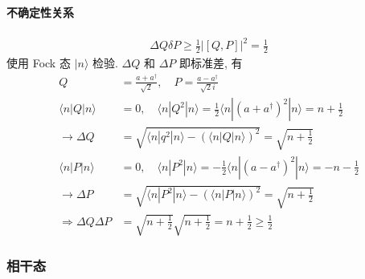 \documentclass[../../main.tex]{subfiles}
\begin{document}
\paragraph{不确定性关系}
\begin{align*}
    \Delta Q\delta P \geq \frac{1}{2}\bigg| [Q,P] \bigg|^{2} = \frac{1}{2}
\end{align*}
使用 Fock 态 $|n\rangle$ 检验. $\Delta Q$ 和 $\Delta P$ 即标准差, 有
\begin{align*}
    Q &= \frac{a + a^{\dagger}}{\sqrt{2}},\quad P = \frac{a - a^{\dagger}}{\sqrt{2}i}\\
    \langle n|Q|n\rangle &= 0,\quad \langle n|Q^{2}|n\rangle = \frac{1}{2}\langle n|(a + a^{\dagger})^{2}|n\rangle = n + \frac{1}{2}\\
    \rightarrow \Delta Q &= \sqrt{\langle n|q^{2}|n\rangle - (\langle n|Q|n\rangle)^{2}} = \sqrt{n + \frac{1}{2}}\\
    \langle n|P|n\rangle &= 0,\quad \langle n|P^{2}|n\rangle = -\frac{1}{2}\langle n|(a - a^{\dagger})^{2}|n\rangle =  - n - \frac{1}{2}\\
    \rightarrow \Delta P &= \sqrt{\langle n|P^{2}|n\rangle - (\langle n|P|n\rangle)^{2}} = \sqrt{n + \frac{1}{2}}\\
    \Rightarrow \Delta Q\Delta P &= \sqrt{n + \frac{1}{2}}\sqrt{n + \frac{1}{2}} = n + \frac{1}{2}\geq \frac{1}{2}
\end{align*}
\subsubsection{相干态}
\end{document}
